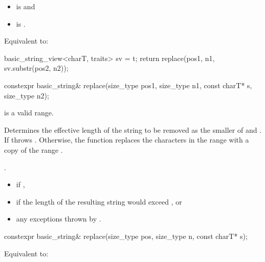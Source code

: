 \begin{itemdescr}
\pnum
\constraints
\begin{itemize}
\item
{} is
 and
\item
{} is
.
\end{itemize}

\pnum
\effects
Equivalent to:
\begin{codeblock}
basic_string_view<charT, traits> sv = t;
return replace(pos1, n1, sv.substr(pos2, n2));
\end{codeblock}
\end{itemdescr}

%
\begin{itemdecl}
constexpr basic_string& replace(size_type pos1, size_type n1, const charT* s, size_type n2);
\end{itemdecl}

\begin{itemdescr}
\pnum
\expects
{} is a valid range.

\pnum
\effects
Determines the effective length  of the string to be
removed as the smaller of  and . If
 throws . Otherwise,
the function replaces the characters in the range
with a copy of the range .

\pnum
\returns
{}.

\pnum
\throws
\begin{itemize}
\item {} if ,
\item {} if the length of the resulting string
would exceed , or
\item any exceptions thrown by .
\end{itemize}
\end{itemdescr}

%
\begin{itemdecl}
constexpr basic_string& replace(size_type pos, size_type n, const charT* s);
\end{itemdecl}

\begin{itemdescr}
\pnum
\effects
Equivalent to: 
\end{itemdescr}

